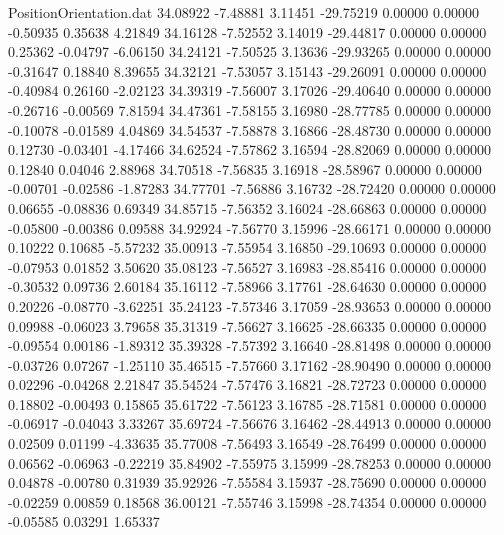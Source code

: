 \begin{filecontents}{PositionOrientation.dat}
  34.08922   -7.48881    3.11451   -29.75219    0.00000    0.00000   -0.50935    0.35638    4.21849
  34.16128   -7.52552    3.14019   -29.44817    0.00000    0.00000    0.25362   -0.04797   -6.06150
  34.24121   -7.50525    3.13636   -29.93265    0.00000    0.00000   -0.31647    0.18840    8.39655
  34.32121   -7.53057    3.15143   -29.26091    0.00000    0.00000   -0.40984    0.26160   -2.02123
  34.39319   -7.56007    3.17026   -29.40640    0.00000    0.00000   -0.26716   -0.00569    7.81594
  34.47361   -7.58155    3.16980   -28.77785    0.00000    0.00000   -0.10078   -0.01589    4.04869
  34.54537   -7.58878    3.16866   -28.48730    0.00000    0.00000    0.12730   -0.03401   -4.17466
  34.62524   -7.57862    3.16594   -28.82069    0.00000    0.00000    0.12840    0.04046    2.88968
  34.70518   -7.56835    3.16918   -28.58967    0.00000    0.00000   -0.00701   -0.02586   -1.87283
  34.77701   -7.56886    3.16732   -28.72420    0.00000    0.00000    0.06655   -0.08836    0.69349
  34.85715   -7.56352    3.16024   -28.66863    0.00000    0.00000   -0.05800   -0.00386    0.09588
  34.92924   -7.56770    3.15996   -28.66171    0.00000    0.00000    0.10222    0.10685   -5.57232
  35.00913   -7.55954    3.16850   -29.10693    0.00000    0.00000   -0.07953    0.01852    3.50620
  35.08123   -7.56527    3.16983   -28.85416    0.00000    0.00000   -0.30532    0.09736    2.60184
  35.16112   -7.58966    3.17761   -28.64630    0.00000    0.00000    0.20226   -0.08770   -3.62251
  35.24123   -7.57346    3.17059   -28.93653    0.00000    0.00000    0.09988   -0.06023    3.79658
  35.31319   -7.56627    3.16625   -28.66335    0.00000    0.00000   -0.09554    0.00186   -1.89312
  35.39328   -7.57392    3.16640   -28.81498    0.00000    0.00000   -0.03726    0.07267   -1.25110
  35.46515   -7.57660    3.17162   -28.90490    0.00000    0.00000    0.02296   -0.04268    2.21847
  35.54524   -7.57476    3.16821   -28.72723    0.00000    0.00000    0.18802   -0.00493    0.15865
  35.61722   -7.56123    3.16785   -28.71581    0.00000    0.00000   -0.06917   -0.04043    3.33267
  35.69724   -7.56676    3.16462   -28.44913    0.00000    0.00000    0.02509    0.01199   -4.33635
  35.77008   -7.56493    3.16549   -28.76499    0.00000    0.00000    0.06562   -0.06963   -0.22219
  35.84902   -7.55975    3.15999   -28.78253    0.00000    0.00000    0.04878   -0.00780    0.31939
  35.92926   -7.55584    3.15937   -28.75690    0.00000    0.00000   -0.02259    0.00859    0.18568
  36.00121   -7.55746    3.15998   -28.74354    0.00000    0.00000   -0.05585    0.03291    1.65337

\end{filecontents}
